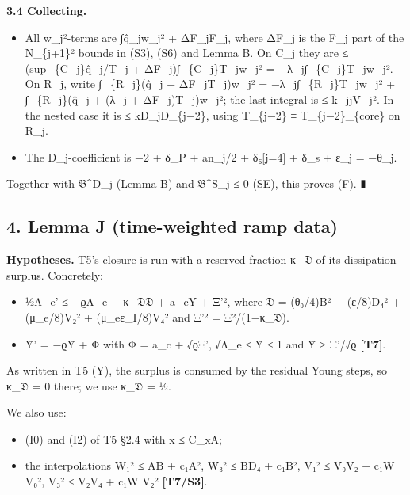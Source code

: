 \documentclass[
]{article}
\providecommand{\tightlist}{%
  \setlength{\itemsep}{0pt}\setlength{\parskip}{0pt}}
\begin{document}
\textbf{3.4 Collecting.}

\begin{itemize}
\tightlist
\item
  All w\_j²-terms are ∫q̂\_jw\_j² + ΔF\_jF\_j, where ΔF\_j is the F\_j
  part of the N\_\{j+1\}² bounds in (S3), (S6) and Lemma B. On C\_j they
  are ≤ (sup\_\{C\_j\}q̂\_j/T\_j + ΔF\_j)∫\_\{C\_j\}T\_jw\_j² =
  −λ\_j∫\_\{C\_j\}T\_jw\_j². On R\_j, write ∫\_\{R\_j\}(q̂\_j +
  ΔF\_jT\_j)w\_j² = −λ\_j∫\_\{R\_j\}T\_jw\_j² + ∫\_\{R\_j\}(q̂\_j + (λ\_j
  + ΔF\_j)T\_j)w\_j²; the last integral is ≤ k\_jjV\_j². In the nested
  case it is ≤ kD\_jD\_\{j−2\}, using T\_\{j−2\} ≡
  T\_\{j−2\}\textbar\_\{core\} on R\_j.
\item
  The D\_j-coefficient is −2 + δ\_P + an\_j/2 + δ₆{[}j=4{]} + δ\_s +
  ε\_j = −θ\_j.
\end{itemize}

Together with 𝔅\^{}D\_j (Lemma B) and 𝔅\^{}S\_j ≤ 0 (SE), this proves
(F). ∎

\hypertarget{lemma-j-time-weighted-ramp-data}{%
\subsection{4. Lemma J (time-weighted ramp
data)}\label{lemma-j-time-weighted-ramp-data}}

\textbf{Hypotheses.} T5's closure is run with a reserved fraction κ\_𝔇
of its dissipation surplus. Concretely:

\begin{itemize}
\tightlist
\item
  ½Λ\_e' ≤ −ϱΛ\_e − κ\_𝔇𝔇 + a\_cY + Ξ'², where 𝔇 = (θ₀/4)B² + (ε/8)D₄² +
  (μ\_e/8)V₂² + (μ\_eε\_I/8)V₄² and Ξ'² = Ξ²/(1−κ\_𝔇).
\item
  Ȳ' = −ϱȲ + Φ with Φ = a\_c + √ϱΞ', √Λ\_e ≤ Ȳ ≤ 1 and Ȳ ≥ Ξ'/√ϱ
  \textbf{{[}T7{]}}.
\end{itemize}

As written in T5 (Y), the surplus is consumed by the residual Young
steps, so κ\_𝔇 = 0 there; we use κ\_𝔇 = ½.

We also use:

\begin{itemize}
\tightlist
\item
  (I0) and (I2) of T5 §2.4 with \textbar x\textbar{} ≤ C\_xA;
\item
  the interpolations W₁² ≤ AB + c₁A², W₃² ≤ BD₄ + c₁B², V₁² ≤ V₀V₂ + c₁W
  V₀², V₃² ≤ V₂V₄ + c₁W V₂² \textbf{{[}T7/S3{]}}.
\end{itemize}
\end{document}
